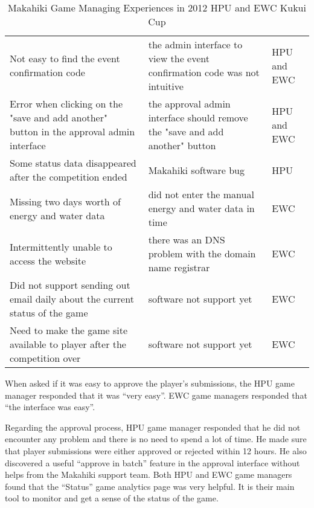 \begin{table}[ht!]
  \centering
  \begin{tabular}{|P{0.4\columnwidth}|P{0.4\columnwidth}|P{0.1\columnwidth}|}
    \hline
    \centering {} &
    \centering {} & 
     \\
    \hline
    Not easy to find the event confirmation code  & the admin interface to view the event confirmation code was not intuitive & HPU and EWC \\
    \hline
    Error when clicking on the "save and add another" button in the approval admin interface &  the approval admin interface should remove the "save and add another" button & HPU and EWC \\
    \hline
    Some status data disappeared after the competition ended & Makahiki software bug & HPU\\
    \hline
    Missing two days worth of energy and water data & did not enter the manual energy and water data in time & EWC\\
    \hline
    Intermittently unable to access the website  & there was an DNS problem with the domain name registrar & EWC\\
    \hline
    Did not support sending out email daily about the current status of the game & software not support yet & EWC \\
    \hline
    Need to make the game site available to player after the competition over & software not support yet & EWC \\
    \hline
  \end{tabular}
  \caption{Makahiki Game Managing Experiences in 2012 HPU and EWC Kukui Cup}
  \label{fig:hpu-ewc-manage}
\end{table}

When asked if it was easy to approve the player's submissions, the HPU game manager responded that it was ``very easy''. EWC game managers responded that ``the interface was easy''.

Regarding the approval process, HPU game manager responded that he did not encounter any problem and there is no need to spend a lot of time. He made sure that player submissions were either approved or rejected within 12 hours. He also discovered a useful ``approve in batch'' feature in the approval interface without helps from the Makahiki support team.  Both HPU and EWC game managers found that the ``Status'' game analytics page was very helpful. It is their main tool to monitor and get a sense of the status of the game.

